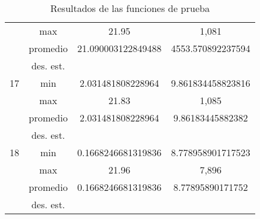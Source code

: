 \documentclass{report}
\begin{document}
\begin{table}[ht]
\begin{tabular}{|c|c|c|c|}
                              & max                         &       21.95     &   1,081     \\ \cline{2-4} 
                              & promedio                    &     21.090003122849488       &   4553.570892237594     \\ \cline{2-4} 
                              & des. est.                   &            &        \\ \hline
        17                    & min                         &      2.031481808228964      &    9.861834458823816    \\ \cline{2-4} 
                              & max                         &       21.83     &    1,085    \\ \cline{2-4} 
                              & promedio                    &        2.031481808228964    &    9.86183445882382    \\ \cline{2-4} 
                              & des. est.                   &            &        \\ \hline
        18                    & min                         &     0.1668246681319836       &    8.778958901717523    \\ \cline{2-4} 
                              & max                         &      21.96      &     7,896   \\ \cline{2-4} 
                              & promedio                    &      0.1668246681319836      &    8.77895890171752    \\ \cline{2-4} 
                              & des. est.                   &            &        \\ \hline

        \end{tabular}
        \caption{Resultados de las funciones de prueba}
        \label{tab:resultados}
    \end{table}
        

        
\end{document}
